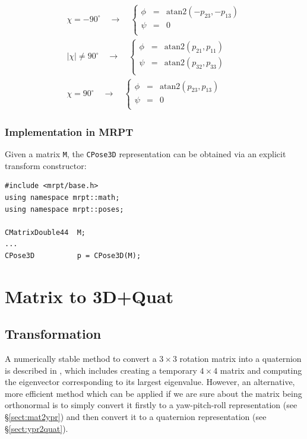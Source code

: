 \documentclass[a4paper,11pt]{report}
\begin{document}
\begin{eqnarray}
  \chi = -90^\circ \quad \longrightarrow \quad
   \left\{
  \begin{array}{rcl}
    \phi  &=& \mathrm{atan2}( -p_{23}, -p_{13} ) \\
    \psi  &=& 0 \\
  \end{array}
   \right. 
\\
  |\chi| \neq 90^\circ \quad \longrightarrow \quad
   \left\{
  \begin{array}{rcl}
    \phi   &=& \mathrm{atan2}(p_{21},p_{11}) \\
    \psi  &=&  \mathrm{atan2}(p_{32},p_{33}) \\
  \end{array}
   \right. 
\\
  \chi = 90^\circ \quad \longrightarrow \quad
   \left\{
  \begin{array}{rcl}
    \phi  &=& \mathrm{atan2}( p_{23}, p_{13} ) \\
    \psi  &=& 0 \\
  \end{array}
   \right. 
\end{eqnarray}



\subsubsection{Implementation in MRPT}

Given a matrix \texttt{M}, the \texttt{CPose3D} representation can be obtained via
an explicit transform constructor:

\begin{lstlisting}
#include <mrpt/base.h> 
using namespace mrpt::math; 
using namespace mrpt::poses; 

CMatrixDouble44  M;
...
CPose3D          p = CPose3D(M);
\end{lstlisting}


\section{Matrix to 3D+Quat }

\subsection{Transformation}

A numerically stable method to convert a $3 \times 3$ rotation matrix into a quaternion is
described in \cite{bar2000new}, which includes creating a temporary $4 \times 4$ matrix and 
computing the eigenvector corresponding to its largest eigenvalue. 
However, an alternative, more efficient method which can be applied if we are sure about 
the matrix being orthonormal is to simply convert it firstly to a yaw-pitch-roll representation 
(see \S \ref{sect:mat2ypr}) and then convert it 
to a quaternion representation (see \S \ref{sect:ypr2quat}).
\end{document}
